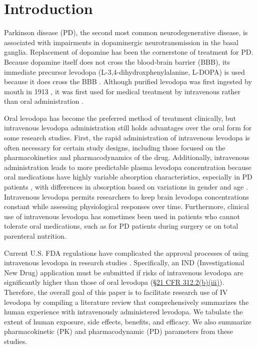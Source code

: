 \section{Introduction}
Parkinson disease (PD), the second most common neurodegenerative disease, is associated with impairments in dopaminergic neurotransmission in the basal ganglia. Replacement of dopamine has been the cornerstone of treatment for PD. Because dopamine itself does not cross the blood-brain barrier (BBB), its immediate precursor levodopa (L-3,4-dihydroxphenylalanine, L-DOPA) is used because it does cross the BBB \cite{11763859,13954967,5334614}. Although purified levodopa was first ingested by mouth in 1913 \cite{Roe_1997}, it was first used for medical treatment by intravenous rather than oral administration \cite{14430381,11763859}.
	
Oral levodopa has become the preferred method of treatment clinically, but intravenous levodopa administration still holds advantages over the oral form for some research studies.  First, the rapid administration of intravenous levodopa is often necessary for certain study designs, including those focused on the pharmacokinetics and pharmacodynamics of the drug.  Additionally, intravenous administration leads to more predictable plasma levodopa concentration because oral medications have highly variable absorption characteristics, especially in PD patients \cite{2797454}, with differences in absorption based on variations in gender and age \cite{2775615,12011296}.  Intravenous levodopa permits researchers to keep brain levodopa concentrations constant while assessing physiological responses over time.  Furthermore, clinical use of intravenous levodopa has sometimes been used in patients who cannot tolerate oral medications, such as for PD patients during surgery or on total parenteral nutrition.  

Current U.S. FDA regulations have complicated the approval processes of using intravenous levodopa in research studies \cite{11801806}.  Specifically, an IND (Investigational New Drug) application must be submitted if risks of intravenous levodopa are significantly higher than those of oral levodopa (\href{http://www.accessdata.fda.gov/scripts/cdrh/cfdocs/cfcfr/CFRSearch.cfm?fr=312.2}{\S 21 CFR 312.2(b)(iii)}).  Therefore, the overall goal of this paper is to facilitate research use of IV levodopa by compiling a literature review that comprehensively summarizes the human experience with intravenously administered levodopa.  We tabulate the extent of human exposure, side effects, benefits, and efficacy.  We also summarize pharmacokinetic (PK) and pharmacodynamic (PD) parameters from these studies. 
